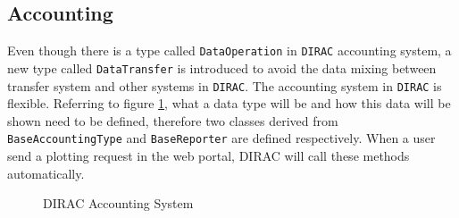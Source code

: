 \subsection{Accounting}

Even though there is a type called {\tt DataOperation} in {\tt DIRAC}
accounting system, a new type called {\tt DataTransfer}
is introduced to avoid the data mixing between transfer system
and other systems in {\tt DIRAC}.
The accounting system 
in {\tt DIRAC} is flexible. Referring to figure \ref{fig:acct},
what a data type will be and how this data will be shown
need to be defined,
therefore two classes derived from {\tt BaseAccountingType}
and {\tt BaseReporter} are defined respectively.
When a user send a plotting request in the web portal, 
DIRAC will call these methods automatically.
\begin{figure}[htbp]
    
    \caption{\label{fig:acct}DIRAC Accounting System}
\end{figure}

